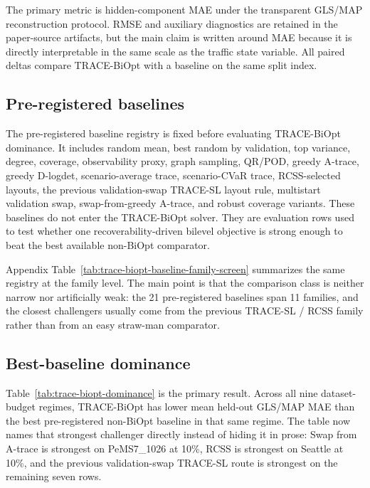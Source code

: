 The primary metric is hidden-component MAE under the transparent GLS/MAP
reconstruction protocol. RMSE and auxiliary diagnostics are retained in the
paper-source artifacts, but the main claim is written around MAE because it is
directly interpretable in the same scale as the traffic state variable. All
paired deltas compare TRACE-BiOpt with a baseline on the same split index.

\subsection{Pre-registered baselines}

The pre-registered baseline registry is fixed before evaluating TRACE-BiOpt dominance. It
includes random mean, best random by validation, top variance, degree, coverage,
observability proxy, graph sampling, QR/POD, greedy A-trace, greedy D-logdet,
scenario-average trace, scenario-CVaR trace, RCSS-selected layouts, the previous
validation-swap TRACE-SL layout rule, multistart validation swap, swap-from-greedy
A-trace, and robust coverage variants. These baselines do not enter the
TRACE-BiOpt solver. They are evaluation rows used to test whether one
recoverability-driven bilevel objective is strong enough to beat the best
available non-BiOpt comparator.

Appendix Table~\ref{tab:trace-biopt-baseline-family-screen} summarizes the
same registry at the family level. The main point is that the comparison class
is neither narrow nor artificially weak: the 21 pre-registered baselines span
11 families, and the closest challengers usually come from the previous
TRACE-SL / RCSS family rather than from an easy straw-man comparator.

\subsection{Best-baseline dominance}


\FloatBarrier

Table~\ref{tab:trace-biopt-dominance} is the primary result.
Across all nine dataset-budget regimes, TRACE-BiOpt has
lower mean held-out GLS/MAP MAE than the best pre-registered non-BiOpt
baseline in that same regime. The table now names that strongest challenger
directly instead of hiding it in prose: Swap from A-trace is strongest on
PeMS7\_1026 at 10\%, RCSS is strongest on Seattle at 10\%, and the previous
validation-swap TRACE-SL route is strongest on the remaining seven rows.

